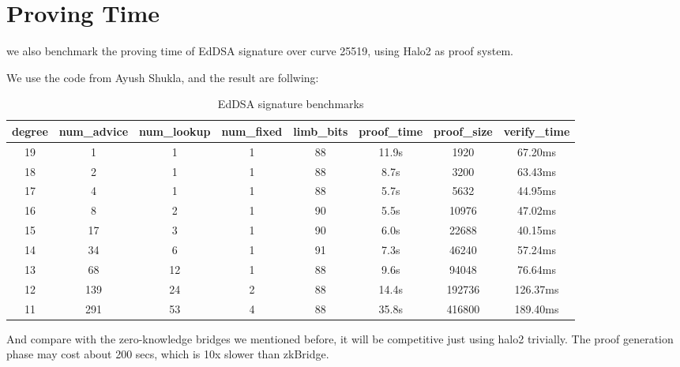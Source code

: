 \documentclass{article}
\begin{document}
\section{Proving Time}

we also benchmark the proving time of EdDSA signature over curve 25519, using Halo2 as proof system.

We use the code from Ayush Shukla, and the result are follwing:

\begin{table}[H]
    \centering
    \begin{tabular}{c|c|c|c|c|c|c|c} \hline
      degree&num\_advice&	num\_lookup&	num\_fixed&	limb\_bits&		proof\_time&	proof\_size&	verify\_time
    \\ \hline
     19&	1	&1	&1&	88&		11.9s&	1920&	67.20ms \\ \hline
     18&	2&	1	&1&	88&	8.7s&	3200	&63.43ms \\ \hline
     17&	4&	1&	1&	88&	5.7s&	5632&	44.95ms \\ \hline
     16&	8&	2&	1&	90&		5.5s&	10976&	47.02ms \\ \hline
     15	&17	&3	&1		&90&	6.0s&	22688&	40.15ms \\ \hline
     14	&34	&6	&1	&	91	&7.3s&	46240&	57.24ms \\ \hline
     13	&68	&	12&	1&	88&		9.6s&	94048&	76.64ms \\ \hline
     12	&139&	24	&2	&	88&	14.4s&	192736&	126.37ms \\ \hline
     11	&291&	53	&4	&	88&		35.8s&	416800	&189.40ms \\ \hline


    \end{tabular}
    \caption{EdDSA signature benchmarks}
    \label{tab:my_label}
\end{table}


And compare with the zero-knowledge bridges we mentioned before, it will be competitive just using halo2 trivially. The proof generation phase may cost about 200 secs, which is 10x slower than zkBridge.
\end{document}
